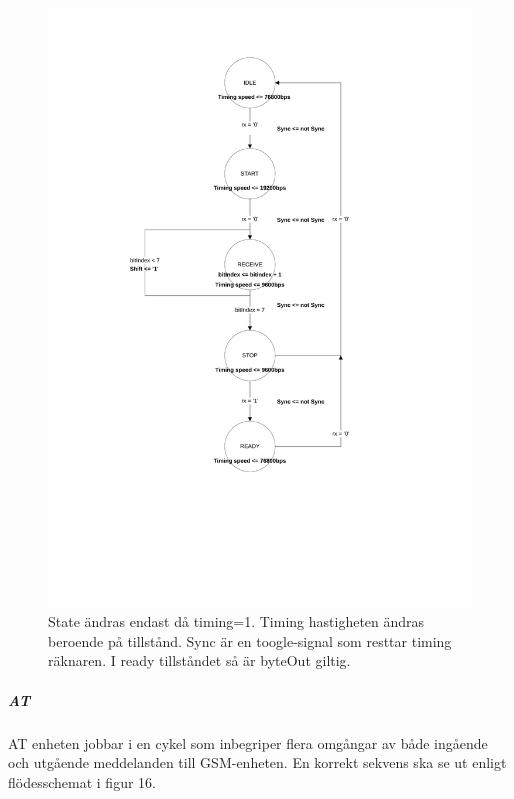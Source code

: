 \documentclass[a4paper]{scrartcl}
\begin{document}
		\begin{figure}[H]
			\centering
			\includegraphics[scale=0.6]{rxmachine.pdf}
			\caption{State ändras endast då timing=1. Timing hastigheten ändras beroende på tillstånd.  Sync är en toogle-signal som resttar timing räknaren. I ready tillståndet så är byteOut giltig.}
		\end{figure}

		\subparagraph{AT}
		AT enheten jobbar i en cykel som inbegriper flera omgångar av både ingående och utgående meddelanden till GSM-enheten. En korrekt sekvens ska se ut enligt flödesschemat i figur 16. 
\end{document}
